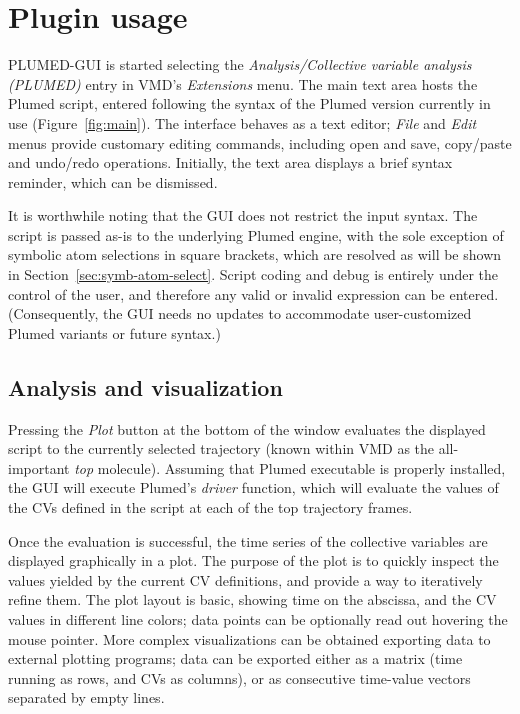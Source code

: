 \documentclass[preprint,review,11pt]{elsarticle}
\begin{document}
\section{Plugin usage}

PLUMED-GUI is started selecting the \emph{Analysis/Collective variable
  analysis (PLUMED)} entry in VMD's \emph{Extensions} menu. The main
text area hosts the Plumed script, entered following the syntax of the
Plumed version currently in use (Figure~\ref{fig:main}).  The
interface behaves as a text editor; \emph{File} and \emph{Edit} menus
provide customary editing commands, including open and save,
copy/paste and undo/redo operations.  Initially, the text area
displays a brief syntax reminder, which can be dismissed.


It is worthwhile noting that the GUI does not restrict the input
syntax. The script is passed as-is to the underlying Plumed engine,
with the sole exception of symbolic atom selections in square
brackets, which are resolved as will be shown in
Section~\ref{sec:symb-atom-select}.  Script coding and debug is
entirely under the control of the user, and therefore any valid or
invalid expression can be entered.  (Consequently, the GUI needs no
updates to accommodate user-customized Plumed variants or future
syntax.)




\subsection{Analysis and visualization}

Pressing the \emph{Plot} button at the bottom of the window evaluates
the displayed script to the currently selected trajectory (known
within VMD as the all-important \emph{top} molecule). Assuming that
Plumed executable is properly installed, the GUI will execute Plumed's
\emph{driver} function, which will evaluate the values of the CVs
defined in the script at each of the top trajectory frames.

Once the evaluation is successful, the time series of the collective
variables are displayed graphically in a plot.  The purpose of the
plot is to quickly inspect the values yielded by the current CV
definitions, and provide a way to iteratively refine them. The plot
layout is basic, showing time on the abscissa, and the CV values in
different line colors; data points can be optionally read out hovering the
mouse pointer.  More complex visualizations can be obtained exporting
data to external plotting programs; data can be exported 
either as a matrix (time running as rows, and CVs as
columns), or as consecutive time-value vectors separated by empty
lines.
\end{document}
